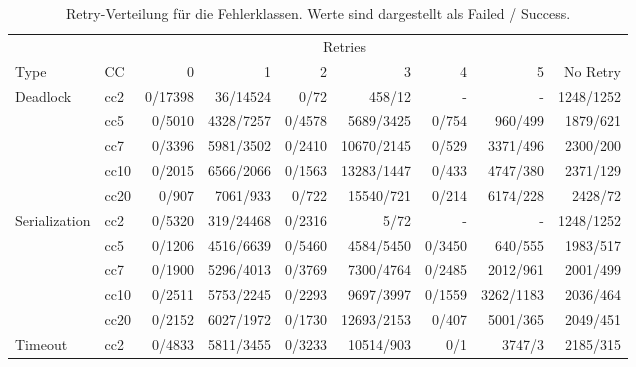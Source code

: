 \begin{table}[htbp]
	\centering
	\caption{Retry-Verteilung für die Fehlerklassen.
	Werte sind dargestellt als Failed / Success.}
	\label{tab:cc-retryDistribution}
	\footnotesize
	\setlength{\tabcolsep}{3pt}

	\begin{tabular}{llrrrrrrr}
		\toprule
		& & \multicolumn{6}{c}{Retries} & \\
		Type & CC & 0 & 1 & 2 & 3 & 4 & 5 & No Retry \\
		\midrule

		\multirow{5}{*}{Deadlock}
		& cc2
		& 0/17398 & 36/14524 & 0/72
		& 458/12 & - & -
		& 1248/1252 \\

		& cc5
		& 0/5010 & 4328/7257 & 0/4578
		& 5689/3425 & 0/754 & 960/499
		& 1879/621 \\

		& cc7
		& 0/3396 & 5981/3502 & 0/2410
		& 10670/2145 & 0/529 & 3371/496
		& 2300/200 \\

		& cc10
		& 0/2015 & 6566/2066 & 0/1563
		& 13283/1447 & 0/433 & 4747/380
		& 2371/129 \\

		& cc20
		& 0/907 & 7061/933 & 0/722
		& 15540/721 & 0/214 & 6174/228
		& 2428/72 \\

		\midrule

		\multirow{5}{*}{Serialization}
		& cc2
		& 0/5320 & 319/24468 & 0/2316
		& 5/72 & - & -
		& 1248/1252 \\

		& cc5
		& 0/1206 & 4516/6639 & 0/5460
		& 4584/5450 & 0/3450 & 640/555
		& 1983/517 \\

		& cc7
		& 0/1900 & 5296/4013 & 0/3769
		& 7300/4764 & 0/2485 & 2012/961
		& 2001/499 \\

		& cc10
		& 0/2511 & 5753/2245 & 0/2293
		& 9697/3997 & 0/1559 & 3262/1183
		& 2036/464 \\

		& cc20
		& 0/2152 & 6027/1972 & 0/1730
		& 12693/2153 & 0/407 & 5001/365
		& 2049/451 \\

		\midrule

		\multirow{5}{*}{Timeout}
		& cc2
		& 0/4833 & 5811/3455 & 0/3233
		& 10514/903 & 0/1 & 3747/3
		& 2185/315 \\


\end{tabular}
\end{table}
